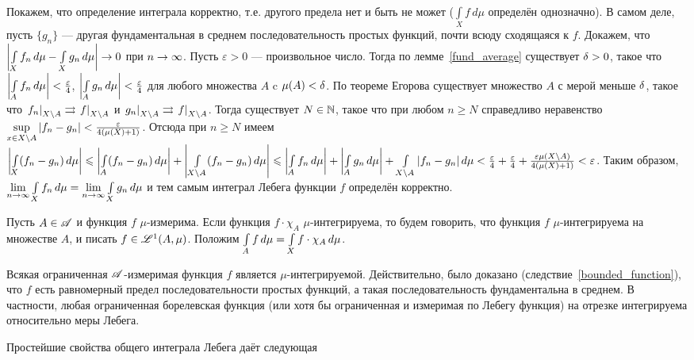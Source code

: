 \documentclass[10pt]{article}
\newcommand{\ve}{\varepsilon}
\begin{document}
Покажем, что определение интеграла корректно, т.е. другого предела
нет и быть не может ($\int\limits_Xf\,d\mu$ определён однозначно). В
самом деле, пусть $\{g_n\}$ --- другая фундаментальная в среднем
последовательность простых функций, почти всюду сходящаяся к $f$.
Докажем, что $\left|\int\limits_Xf_n\,d\mu\bw
-\int\limits_Xg_n\,d\mu\right|\ra0$ при $n\rightarrow\infty$. Пусть $\ve>0$
--- произвольное число. Тогда по лемме~\ref{fund_average} существует
$\delta>0$, такое что $\left|\int\limits_Af_n\,d\mu\right|\bw
<\frac{\ve}4$, $\left|\int\limits_Ag_n\,d\mu\right|\bw<\frac{\ve}4$
для любого множества $A$ c $\mu(A)<\delta$. По теореме Егорова
существует множество $A$ с мерой меньше $\delta$, такое что
$\left.f_n\right|_{X\backslash A}\bw \rra
\left.f\right|_{X\backslash A}$ и $\left.g_n\right|_{X\backslash
A}\rightrightarrows \left.f\right|_{X\backslash A}$. Тогда существует $N\in\mathbb{N}$,
такое что при любом $n\ge N$ справедливо неравенство
$\sup\limits_{x\in X\backslash A}|f_n-g_n|\bw
<\frac{\ve}{4(\mu(X)+1)}$. Отсюда при $n\ge N$ имеем
$\left|\int\limits_X(f_n-g_n)\,d\mu\right|\bw \le
\left|\int\limits_A(f_n-g_n)\,d\mu\right|\bw
+\left|\int\limits_{X\backslash A}(f_n-g_n)\,d\mu\right|\bw
\le\left|\int\limits_Af_n\,d\mu\right|\bw
+\left|\int\limits_Ag_n\,d\mu\right|\bw +\int\limits_{X\backslash
A}|f_n-g_n|\,d\mu\bw
<\frac{\ve}4+\frac{\ve}4+\frac{\ve\mu(X\backslash
A)}{4(\mu(X)+1)}\bw <\ve$. Таким образом,
$\lim\limits_{n\ra\infty}\int\limits_Xf_n\,d\mu\bw
=\lim\limits_{n\ra\infty}\int\limits_Xg_n\,d\mu$ и тем самым
интеграл Лебега функции $f$ определён корректно.

\begin{note}
Пусть $A\in\mathscr{A}$ и функция $f$ $\mu$-измерима. Если функция
$f\cdot\chi_A$ $\mu$-интегрируема, то будем говорить, что функция
$f$ $\mu$-интегрируема на множестве $A$, и писать $f\in
\mathscr{L}^1(A,\mu)$. Положим $\int\limits_Af\,d\mu\bw
=\int\limits_Xf\cdot\chi_A\,d\mu$.
\end{note}

\begin{ex}
Всякая ограниченная $\mathscr{A}$-измеримая функция $f$ является
$\mu$-интегрируемой. Действительно, было доказано
(следствие~\ref{bounded_function}), что $f$ есть равномерный предел
последовательности простых функций, а такая последовательность
фундаментальна в среднем. В частности, любая ограниченная
борелевская функция (или хотя бы ограниченная и измеримая по Лебегу
функция) на отрезке интегрируема относительно меры Лебега.
\end{ex}

Простейшие свойства общего интеграла Лебега даёт следующая
\end{document}
